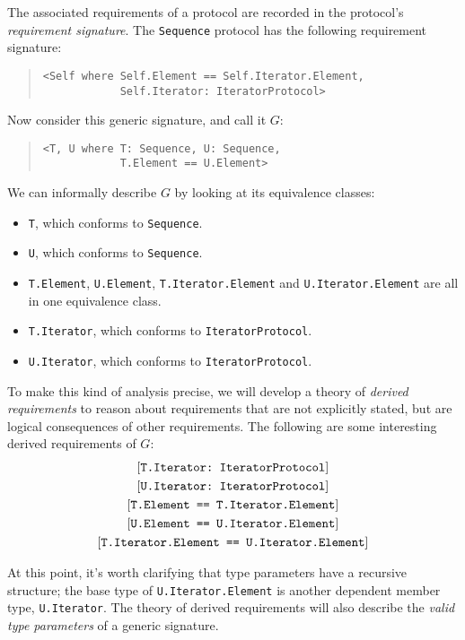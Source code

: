 \documentclass[../generics]{subfiles}
\begin{document}
The associated requirements of a protocol are recorded in the protocol's \emph{requirement signature}. The \texttt{Sequence} protocol has the following requirement signature:
\begin{quote}
\begin{verbatim}
<Self where Self.Element == Self.Iterator.Element,
            Self.Iterator: IteratorProtocol>
\end{verbatim}
\end{quote}
Now consider this generic signature, and call it $G$:
\begin{quote}
\begin{verbatim}
<T, U where T: Sequence, U: Sequence,
            T.Element == U.Element>
\end{verbatim}
\end{quote}
We can informally describe $G$ by looking at its equivalence classes:
\begin{itemize}
\item \texttt{T}, which conforms to \texttt{Sequence}.
\item \texttt{U}, which conforms to \texttt{Sequence}.
\item \texttt{T.Element}, \texttt{U.Element}, \texttt{T.Iterator.Element} and \texttt{U.Iterator.Element} are all in one equivalence class.
\item \texttt{T.Iterator}, which conforms to \texttt{IteratorProtocol}.
\item \texttt{U.Iterator}, which conforms to \texttt{IteratorProtocol}.
\end{itemize}
To make this kind of analysis precise, we will develop a theory of \emph{derived requirements} to reason about requirements that are not explicitly stated, but are logical consequences of other requirements. The following are some interesting derived requirements of $G$:
\begin{gather*}
\ConfReq{T.Iterator}{IteratorProtocol}\\
\ConfReq{U.Iterator}{IteratorProtocol}\\
\SameReq{T.Element}{T.Iterator.Element}\\
\SameReq{U.Element}{U.Iterator.Element}\\
\SameReq{T.Iterator.Element}{U.Iterator.Element}
\end{gather*}

At this point, it's worth clarifying that type parameters have a recursive structure; the base type of \texttt{U.Iterator.Element} is another dependent member type, \texttt{U.Iterator}. The theory of derived requirements will also describe the \emph{valid type parameters} of a generic signature.
\end{document}

